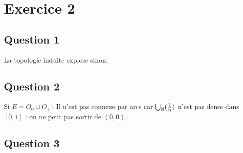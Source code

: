 \documentclass{cours}
\begin{document}
\section{Exercice 2}
\subsection{Question 1}
La topologie induite explose sinon.

\subsection{Question 2}
Si $E = O_{0} \cup O_{1}$ :
Il n'est pas connexe par arcs car $\bigcup_{\mathbb{N}}(\frac{1}{n})$ n'est pas dense dans $[0, 1]$ : on ne peut pas sortir de $(0, 0)$.

\subsection{Question 3}
\end{document}
